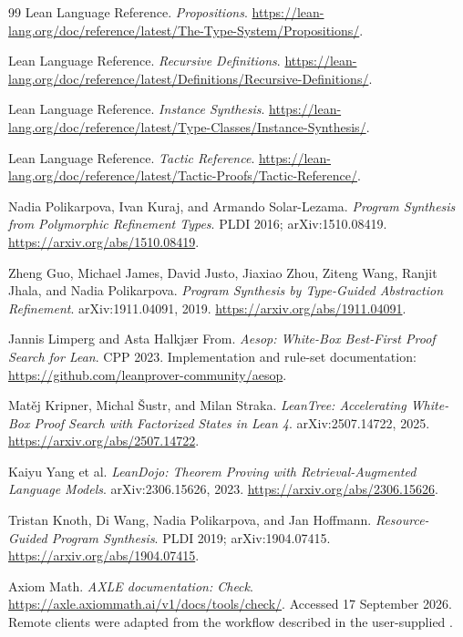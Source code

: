 \documentclass[11pt,letterpaper]{article}
\newcommand{\code}[1]{\texttt{\detokenize{#1}}}
\theoremstyle{definition}\newtheorem{definition}[theorem]{Definition}
\theoremstyle{remark}\newtheorem{remark}[theorem]{Remark}
\begin{document}
\begin{thebibliography}{99}
Lean Language Reference. \emph{Propositions}.
\url{https://lean-lang.org/doc/reference/latest/The-Type-System/Propositions/}.

Lean Language Reference. \emph{Recursive Definitions}.
\url{https://lean-lang.org/doc/reference/latest/Definitions/Recursive-Definitions/}.

Lean Language Reference. \emph{Instance Synthesis}.
\url{https://lean-lang.org/doc/reference/latest/Type-Classes/Instance-Synthesis/}.

Lean Language Reference. \emph{Tactic Reference}.
\url{https://lean-lang.org/doc/reference/latest/Tactic-Proofs/Tactic-Reference/}.

Nadia Polikarpova, Ivan Kuraj, and Armando Solar-Lezama.
\emph{Program Synthesis from Polymorphic Refinement Types}.
PLDI 2016; arXiv:1510.08419.
\url{https://arxiv.org/abs/1510.08419}.

Zheng Guo, Michael James, David Justo, Jiaxiao Zhou, Ziteng Wang,
Ranjit Jhala, and Nadia Polikarpova.
\emph{Program Synthesis by Type-Guided Abstraction Refinement}.
arXiv:1911.04091, 2019.
\url{https://arxiv.org/abs/1911.04091}.

Jannis Limperg and Asta Halkj{\ae}r From.
\emph{Aesop: White-Box Best-First Proof Search for Lean}. CPP 2023.
Implementation and rule-set documentation:
\url{https://github.com/leanprover-community/aesop}.

Mat\v{e}j Kripner, Michal \v{S}ustr, and Milan Straka.
\emph{LeanTree: Accelerating White-Box Proof Search with Factorized States in
Lean 4}. arXiv:2507.14722, 2025.
\url{https://arxiv.org/abs/2507.14722}.

Kaiyu Yang et al.
\emph{LeanDojo: Theorem Proving with Retrieval-Augmented Language Models}.
arXiv:2306.15626, 2023.
\url{https://arxiv.org/abs/2306.15626}.

Tristan Knoth, Di Wang, Nadia Polikarpova, and Jan Hoffmann.
\emph{Resource-Guided Program Synthesis}. PLDI 2019; arXiv:1904.07415.
\url{https://arxiv.org/abs/1904.07415}.

Axiom Math. \emph{AXLE documentation: Check}.
\url{https://axle.axiommath.ai/v1/docs/tools/check/}.
Accessed 17 September 2026. Remote clients were adapted from the workflow
described in the user-supplied \code{tools.zip}.
\end{thebibliography}
\end{document}
